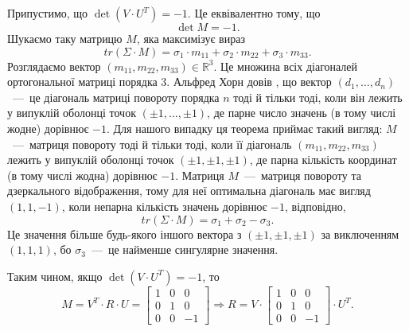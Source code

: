 Припустимо, що $ \det{ \left( V \cdot U^T \right) } = -1$.
Це еквівалентно тому, що
\begin{equation*}
  \det{M} =
  -1.
\end{equation*}
Шукаємо таку матрицю $M$, яка максимізує вираз
\begin{equation*}
  tr \left( \Sigma \cdot M \right) =
  \sigma_1 \cdot m_{11} + \sigma_2 \cdot m_{22} + \sigma_3 \cdot m_{33}.
\end{equation*}
Розглядаємо вектор $ \left( m_{11}, m_{22}, m_{33} \right) \in \mathbb{R}^3$.
Це множина всіх діагоналей ортогональної матриці порядка $3$.
Альфред Хорн довів \cite{horn:diagonal:rotation},
що вектор $ \left( d_1, \dotsc, d_n \right) $~---~це діагональ матриці повороту
порядка  $n$ тоді й тільки тоді,
коли він лежить у випуклій оболонці точок $ \left( \pm 1, \dotsc, \pm 1 \right) $,
де парне число значень (в тому числі жодне) дорівнює $-1$.
Для нашого випадку ця теорема приймає такий вигляд:
$M$~---~матриця повороту тоді й тільки тоді,
коли її діагональ $ \left( m_{11}, m_{22}, m_{33} \right) $ лежить у випуклій оболонці точок
$ \left( \pm 1, \pm 1, \pm 1 \right) $, де парна кількість координат
(в тому числі жодна) дорівнює $-1$.
Матриця $M$~---~матриця повороту та дзеркального відображення,
тому для неї оптимальна діагональ має вигляд $ \left( 1, 1, -1 \right) $,
коли непарна кількість значень дорівнює $-1$, відповідно,
\begin{equation*}
  tr \left( \Sigma \cdot M \right) = \sigma_1 + \sigma_2 - \sigma_3.
\end{equation*}
Це значення більше будь-якого іншого вектора з
$ \left( \pm 1, \pm 1, \pm 1 \right) $ за виключенням
$ \left( 1, 1, 1 \right) $, бо $ \sigma_3$~---~це найменше сингулярне значення.

Таким чином, якщо $ \det{ \left( V \cdot U^T \right) } = -1$, то
\begin{equation*}
  M =
  V^T \cdot R \cdot U =
  \begin{bmatrix}
    1 & 0 & 0 \\
    0 & 1 & 0 \\
    0 & 0 & -1
  \end{bmatrix} \Rightarrow
  R =
  V \cdot
  \begin{bmatrix}
    1 & 0 & 0 \\
    0 & 1 & 0 \\
    0 & 0 & -1
  \end{bmatrix} \cdot U^T.
\end{equation*}

